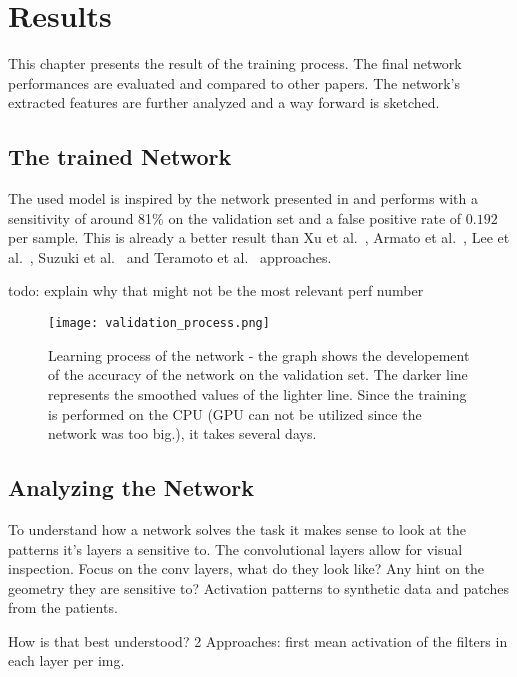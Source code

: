 \documentclass[main.tex]{subfiles}
\begin{document}
\chapter{Results}\label{chap:results}
This chapter presents the result of the training process. The final network performances are evaluated and compared to other papers. The network's extracted features are further analyzed and a way forward is sketched.

\section{The trained Network}
The used model is inspired by the network presented in \cite{huang2017lung} and performs with a sensitivity of around 81$\%$ on the validation set and a false positive rate of $0.192$ per sample. This is already a better result than Xu et al.~\cite{xu1997development}, Armato et al.~\cite{armato1999computerized}, Lee et al.~\cite{lee2001automated}, Suzuki et al.~\cite{suzuki2003massive} and Teramoto et al.~\cite{teramoto2013fast} approaches.

todo: explain why that might not be the most relevant perf number


\begin{figure}
\begin{center}
\texttt{[image: validation\_process.png]}
\end{center}
\caption{Learning process of the network - the graph shows the developement of the accuracy of the network on the validation set. The darker line represents the smoothed values of the lighter line. Since the training is performed on the CPU (GPU can not be utilized since the network was too big.), it takes several days.}
\label{fig:validation}
\end{figure}


\section{Analyzing the Network}
To understand how a network solves the task it makes sense to look at the patterns it's layers a sensitive to. The convolutional layers allow for visual inspection.
Focus on the conv layers, what do they look like? Any hint on the geometry they are sensitive to?
Activation patterns to synthetic data and patches from the patients.

How is that best understood? 2 Approaches: first mean activation of the filters in each layer per img.
\end{document}
